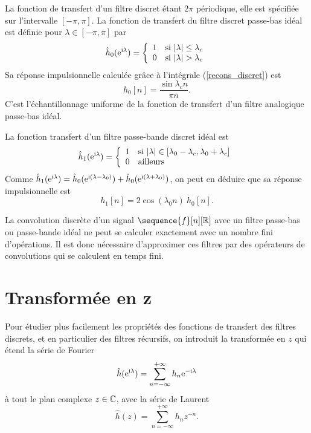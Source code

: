 \begin{example}
La fonction de transfert d'un
filtre discret \'etant $2\pi$ p\'eriodique,
elle est sp\'ecifi\'ee sur l'intervalle $[-\pi,\pi]$.
La fonction de transfert
du filtre discret passe-bas id\'eal est d\'efinie pour
$\lambda \in [-\pi,\pi]$ par
\begin{equation}
\label{passe-bas-discret}
\hat h_0 ( \mathrm{e}^{\mathrm{i} \lambda}  ) =
   \left \{ \begin{array}{ll}
            1 & \mbox{si $| \lambda | \leq \lambda_c$}\\
            0 & \mbox{si $| \lambda | > \lambda_c$}
            \end{array}
   \right.
\end{equation}
Sa r\'eponse impulsionnelle calcul\'ee gr\^ace
\`a l'int\'egrale (\ref{recons_discret}) est
\begin{equation}
h_0 [n] = \frac{\sin \lambda_c n} { \pi n} .
\end{equation}
C'est l'\'echantillonnage uniforme de la fonction de transfert
d'un filtre analogique passe-bas id\'eal.

La fonction transfert d'un filtre passe-bande discret id\'eal
est
\begin{equation}
\hat h_1 ( {\mathrm{e}^{\mathrm{i} \lambda}}  ) =
   \left\{ \begin{array}{ll}
1 & \mbox{si $|\lambda| \in [\lambda_0 - \lambda_c , \lambda_0 + \lambda_c ]$}\\
0 & \mbox{ailleurs}
\end{array}
   \right.
\end{equation}
Comme $\hat h_1({\mathrm{e}^{\mathrm{i} \lambda}}) = \hat h_0 (\mathrm{e}^{\mathrm{i}(\lambda-\lambda_0) }) +
\hat h_0 (\mathrm{e}^{\mathrm{i}(\lambda+\lambda_0) }) $, on peut en d\'eduire que
sa r\'eponse impulsionnelle est
\[
h_1 [n] =
2 \cos (\lambda_0 n)~ h_0[n].
\]

La convolution discr\`ete d'un signal $\sequence{f}[n][\zset]$ avec un filtre
passe-bas ou passe-bande id\'eal ne peut se calculer exactement
avec un nombre fini d'op\'erations. Il est donc n\'ecessaire
d'approximer ces filtres par des op\'erateurs de convolutions
qui se calculent en temps fini.
\end{example}


\section{Transform\'ee en z}

Pour \'etudier plus facilement les propri\'et\'es des fonctions
de transfert des filtres discrets, et en particulier des
filtres r\'ecursifs,
on introduit la transform\'ee en $z$
qui \'etend la s\'erie de Fourier
\begin{equation}
\hat{h} ({\mathrm{e}^{\mathrm{i} \lambda}}) = \sum_{n=-\infty}^{+\infty} h_n {\mathrm{e}^{-\mathrm{i} \lambda}}
\end{equation}
\`a tout le plan complexe $z \in \mathbb{C}$, avec la s\'erie de Laurent
\begin{equation}
\hat h(z) = \sum_{n=-\infty}^{+\infty} h_n z^{-n} .
\end{equation}
\\
\\
